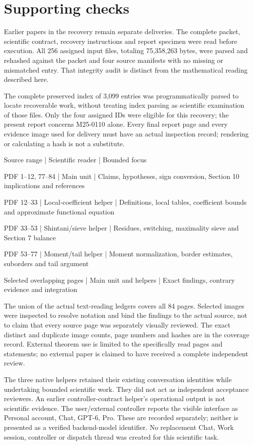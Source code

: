 \documentclass[10pt]{article}
\begin{document}
\section*{Supporting checks}
Earlier papers in the recovery remain separate deliveries. The complete packet, scientific contract, recovery instructions and report specimen were read before execution. All 256 assigned input files, totaling 75,358,263 bytes, were parsed and rehashed against the packet and four source manifests with no missing or mismatched entry. That integrity audit is distinct from the mathematical reading described here.\par
The complete preserved index of 3,099 entries was programmatically parsed to locate recoverable work, without treating index parsing as scientific examination of those files. Only the four assigned IDs were eligible for this recovery; the present report concerns M25-0110 alone. Every final report page and every evidence image used for delivery must have an actual inspection record; rendering or calculating a hash is not a substitute.\par
Source range | Scientific reader | Bounded focus\par
PDF 1–12, 77–84 | Main unit | Claims, hypotheses, sign conversion, Section 10 implications and references\par
PDF 12–33 | Local-coefficient helper | Definitions, local tables, coefficient bounds and approximate functional equation\par
PDF 33–53 | Shintani/sieve helper | Residues, switching, maximality sieve and Section 7 balance\par
PDF 53–77 | Moment/tail helper | Moment normalization, border estimates, suborders and tail argument\par
Selected overlapping pages | Main unit and helpers | Exact findings, contrary evidence and integration\par
The union of the actual text-reading ledgers covers all 84 pages. Selected images were inspected to resolve notation and bind the findings to the actual source, not to claim that every source page was separately visually reviewed. The exact distinct and duplicate image counts, page numbers and hashes are in the coverage record. External theorem use is limited to the specifically read pages and statements; no external paper is claimed to have received a complete independent review.\par
The three native helpers retained their existing conversation identities while undertaking bounded scientific work. They did not act as independent acceptance reviewers. An earlier controller-contract helper’s operational output is not scientific evidence. The user/external controller reports the visible interface as Personal account, Chat, GPT-6, Pro. These are recorded separately; neither is presented as a verified backend-model identifier. No replacement Chat, Work session, controller or dispatch thread was created for this scientific task.\par
\end{document}

